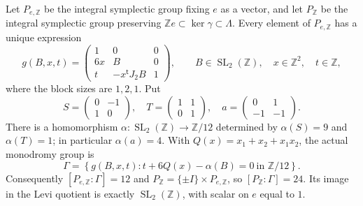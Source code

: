 \begin{theorem}[F.1.1; Proved]\label{st:F.1.1}
Let $P_{e,\mathbb Z}$ be the integral symplectic group fixing $e$ as a
vector, and let $P_{\mathbb Z}$ be the integral symplectic group preserving
$\mathbb Ze\subset\ker\gamma\subset\Lambda$.  Every element of
$P_{e,\mathbb Z}$ has a unique expression
\begin{equation}\label{eq:F-g}
 g(B,x,t)=
 \begin{pmatrix}
 1&0&0\\6x&B&0\\t&-x^{\mathsf t}J_2B&1
 \end{pmatrix},\qquad
 B\in\operatorname{SL}_2(\mathbb Z),\quad x\in\mathbb Z^2,\quad t\in\mathbb Z,
\end{equation}
where the block sizes are $1,2,1$.  Put
\[
 S=\begin{pmatrix}0&-1\\1&0\end{pmatrix},\quad
 T=\begin{pmatrix}1&1\\0&1\end{pmatrix},\quad
 a=\begin{pmatrix}0&1\\-1&-1\end{pmatrix}.
\]
There is a homomorphism
$\alpha:\operatorname{SL}_2(\mathbb Z)\to\mathbb Z/12$ determined by
$\alpha(S)=9$ and $\alpha(T)=1$; in particular $\alpha(a)=4$.
With $Q(x)=x_1+x_2+x_1x_2$, the actual monodromy group is
\begin{equation}\label{eq:F-Gamma}
 \Gamma=\left\{g(B,x,t):t+6Q(x)-\alpha(B)=0\ \text{in }\mathbb Z/12\right\}.
\end{equation}
Consequently $[P_{e,\mathbb Z}:\Gamma]=12$ and
$P_{\mathbb Z}=\{\pm I\}\times P_{e,\mathbb Z}$, so
$[P_{\mathbb Z}:\Gamma]=24$.  Its image in the Levi quotient is exactly
$\operatorname{SL}_2(\mathbb Z)$, with scalar on $e$ equal to $1$.
\end{theorem}

